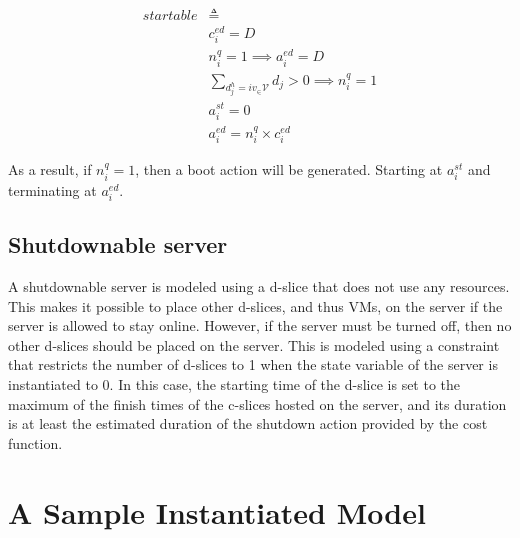 \begin{equation*}
\begin{split}
startable & \triangleq \\
& c_i^{ed} = D \\
& n_i^{q} = 1 \implies a_i^{ed} = D \\
& \sum_{d_j^h = i v_ \in \mathcal{V} }d_j > 0 \implies n_i^q = 1\\
& a_i^{st} = 0 \\
& a_i^{ed} = n_i^q \times c_i^{ed}
\end{split}
\end{equation*}

As a result, if $n_i^q = 1$, then a boot action will be generated. Starting at $a_i^{st}$ and terminating at $a_i^{ed}$.

\subsection{Shutdownable server}

A shutdownable server is modeled using a d-slice that does not use any
resources.  This makes it possible to place other d-slices, and thus VMs,
on the server if the server is
allowed to stay online.  However, if the server must be turned off, then
no other d-slices should be placed on the server.  This is modeled using a
constraint that restricts the number of d-slices to 1 when the state
variable of the server is instantiated to $0$. In this case, the starting
time of the d-slice is set to the maximum of the finish times of the
c-slices hosted on the server, and its duration is at least
the estimated duration of the shutdown action
provided by the cost function.

\section{A Sample Instantiated Model}


